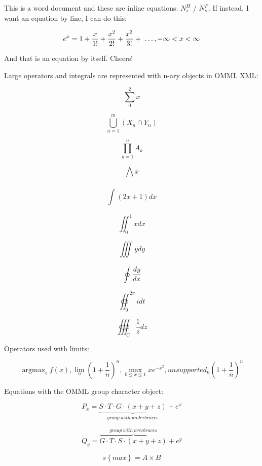 \documentclass[11pt,a4paper]{article}
\begin{document}
This is a word document and these are inline equations: $N_{s}^{H}$ / $N_{s}^{P}$ ​. If instead, I want an equation by line, I can do this:

$$e^{x}=1+\frac{x}{1!}+\frac{x^{2}}{2!}+\frac{x^{3}}{3!}+ \text{ \textellipsis } , - \infty < x < \infty$$

And that is an equation by itself. Cheers!

Large operators and integrals are represented with n-ary objects in OMML XML:

$$\sum_{0}^{2}x$$

$$\bigcup_{n=1}^{m}\left(X_{n} \cap Y_{n}\right)$$

$$\prod_{k=1}^{n}A_{k}$$

$$\bigwedge_{}^{}x$$

$$\int_{}^{}(2x+1)dx$$

$$\iint_{0}^{1}xdx$$

$$\iiint_{}^{}ydy$$

$$\oint_{}^{}\frac{dy}{dx}$$

$$\oiint_{0}^{2 \pi }idt$$

$$\oiiint_{C}^{}\frac{1}{z}dz$$

Operators used with limits:

$$\operatorname{argmax}_{ \epsilon}f(x), \lim_{n}{\left(1+\frac{1}{n}\right)}^{n} , \max_{0 \leq x \leq 1}xe^{-x^{2}}, unsupported_{n}{\left(1+\frac{1}{n}\right)}^{n}$$

Equations with the OMML group character object:

$$P_{ x}=\underbrace{S \cdot T \cdot G \cdot (x+y+z)}_{group\ with\ underbraces}+e^{x}$$

$$Q_{ y}=\overset{group\ with\ overbraces}{\overbrace{G \cdot T \cdot S \cdot (x+y+z)}}+e^{y}$$

$$s\left\{max\right\}= A \times B$$
\end{document}
